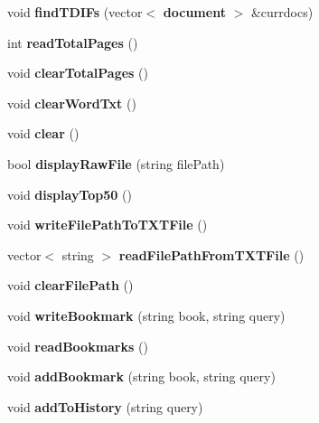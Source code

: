 \begin{DoxyCompactItemize}
\item 
void {\bfseries find\+T\+D\+I\+Fs} (vector$<$ {\bf document} $>$ \&currdocs)\label{class_search_engine_a3d873d763983aff96bfa5b53a5ce1857}

\item 
int {\bfseries read\+Total\+Pages} ()\label{class_search_engine_aa5eeb7c14f04c71458626a4e42fb7f90}

\item 
void {\bfseries clear\+Total\+Pages} ()\label{class_search_engine_a32cc85f13141666446a3970dccbf2b3f}

\item 
void {\bfseries clear\+Word\+Txt} ()\label{class_search_engine_a7cbf38d7d2d78b8f85fcb722df5d509f}

\item 
void {\bfseries clear} ()\label{class_search_engine_a0fff04096cc03d5812306d35621556a0}

\item 
bool {\bfseries display\+Raw\+File} (string file\+Path)\label{class_search_engine_ad995e4339f832125cd4de230bbf4343f}

\item 
void {\bfseries display\+Top50} ()\label{class_search_engine_a7afe7195e04733c109e8b3cd3d38c7be}

\item 
void {\bfseries write\+File\+Path\+To\+T\+X\+T\+File} ()\label{class_search_engine_ab7e13d869a81e670969fc6f081340692}

\item 
vector$<$ string $>$ {\bfseries read\+File\+Path\+From\+T\+X\+T\+File} ()\label{class_search_engine_a010df9478350578057cf319fad1f6eea}

\item 
void {\bfseries clear\+File\+Path} ()\label{class_search_engine_a898495849f799fdde2d626980e00882c}

\item 
void {\bfseries write\+Bookmark} (string book, string query)\label{class_search_engine_ac6a8ee08a20a31f6ba06fb1a85e695ad}

\item 
void {\bfseries read\+Bookmarks} ()\label{class_search_engine_ae5ad9234b0e6c8ebb408bb01693b9f33}

\item 
void {\bfseries add\+Bookmark} (string book, string query)\label{class_search_engine_afe7ea87d4ab4ff654d38b71624d12312}

\item 
void {\bfseries add\+To\+History} (string query)\label{class_search_engine_a1b8486fd4b7e4169e8a9dc61dab4346b}


\end{DoxyCompactItemize}
